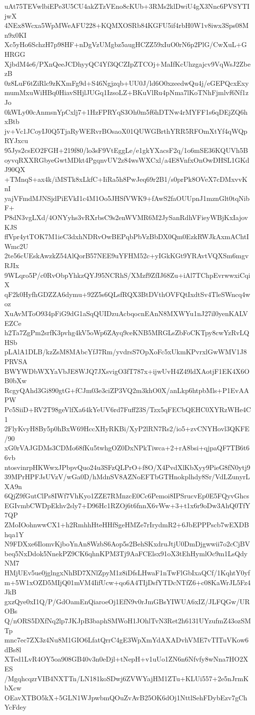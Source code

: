 uAt75TEVwlbiEPe3U5CU4akZTzVEno8cKUb+3RMs2klDwiU4gX3Nnc6PVSYTIjwX
4NEx8Wcxa5WpMWeAFU228+KQMXOSRb84KGFU5if4rbH0W1v8iwx3Sps08Mn9x0KI
Xc5yHo6SchzH7p98HF+nDgVzUMgbz5augHCZZ59xIuO0rN6p2PlG/CwXuL+GHRGG
XjbdM4e6/PXnQeeJCDhyyQC4Yf3QCZIpZTCOj+MaIfKcUhzgajcv9VqWsJ2ZbezB
0z8LuF6tZiRlc9zKXmFg9d+S46Ngjzqb+UU0J/ld6O0xzeedwQu4j/eGEPQcxExy
mumMxuWiHBq0HiavSHjlJUGq1IzsoLZ+BKuVlRu4pNma7lKoTNhFjmlvf6Nf1zJo
0kWLy00cAnmsnYpCxlj7+1HzFPRYqS3Oh0m5f6hDTNw4rMYFF1s6qDEjZQ6hxBtb
jv+Vc1JCoyIJ0Q5TjaRyWERvrBOsaoX01QUWGBrthYRR5RFOmXtYf4qWQpRYJxcu
95Jys2csEO2FGH+219f80/lo3sF9VtEggLe/e1gkYXacsF2q/1o6mSE36KQUVh5B
oyvqRXXRGbyeGwtMDkt4PgqnvUV2z84wsWXCxl/a4E8VnfxOnOwDHSL1GKdJ90QX
+TMnqS+ax4k/iMSTk8xLkfC+IiRa5h8PwJeq69r2B1/s0prPk8OVeX7cDMxvvKnI
yajVFmdMJNSjdPiEVkI1c4M1Oo5JHSfVWK9+fAwS2faOUUpnJ1mznGlt0tqNibF+
P8dN3vgLXd/4ONYyhs3vRXrbsC9s2enWVMR6M2JySanRdhVFieyWBjKxIajovKJS
ffVpr4ytTOK7M1ieC3dxhNDRvOwBEPqbPbVzBbDX0Qm0EzkRWJkAxmAChtIWmc2U
2te56cUEskAwzkZ54AlQorB57NEE9uYFHM52c+yIGkKGt9YRAvtVQXSm6mgvRJIx
9WLqro5P/c0RvObpYhkzQYJ95NCRhS/XMzf9ZfIJ68Zu+iAl7TChpEvrwwxiCqiX
qF2k0HyfhGDZZA6dymu+92Z5s6QLsfRQX3BtDVthOVFQtIxdtSv4TleSWncq4woz
XuAvMToO934pFiG9dG1aSqQUIDzuAcbqocnEAnN8MXWYu1nJ27il0yenKALVEZCe
h2Ta7ZgPm2srfK3pvhg4kV5oWp6ZAyq9ceKNB5MRGLsZbFoCKTpy8cwYzRvLQHSb
pLAlA1DLB/kzZsM8MAbcYfJ7Rm/yvdrsS7OpXoFc5xUkmKPvrxlGwWMV1J8PRVSA
BWYWDbWXYaVbJE8WJQ7JXsvigO3fT787x+ijwUvH4Z49ldXAotjF1EK4X6OB0bXw
RcgyQAhd3Gi890gtG+fCJm03e3ciZP3VQ2m3khO0X/anLkp6htpbMls+P1EvAAPW
Pc5SiiD+RV2T98geVlfXa64kYeUV6rd7Fuff23S/Tzx5qFECbQEHC0XYRzWHe4C1
2FlyKvyH8By5p0hBxW69HccXHyRKBi/XyP2lRN7Rs2/io5+zvCNYHovl3QKFE/90
xG0rVAJGDMs3CDMo68fKu5twhgOZ0DxNPkTiwca+2+rA8bsi+qjpaQF7TB6t66vb
ntosvinrpHKWwxJPbpvQuo24u3SFzQLPrO+f8O/X4PvdXlKbXyy9PieG8fN0ytj9
39MPrHPFJsUVzV/wGa0D/hMdnSV8AZNoEFTbGTHnokplhdy8Sr/VdLZunyrLXA9n
6QjZ9fGutClPs8IWf7VhKyo1ZZE7RMnzcE0Cc6Pemoi8IPSrucvEp0E5FQyvGhcs
EGIvmbCWDpEkhv2sly7+D96Hc1RZOj6t6fnnX6vWw+3+t1x6r9oDw3AhQ0TfY7QP
ZMoIOohnwwCX1+h2RmhhHteHHfSgeHMZe7rIrydmR2+6JbEPPPscb7wEXDBhqa1Y
N9FDXxe6IlomvKjboYnAn8WzbS6Aop5s2BehSKxdruJtjU0DmDjgwwii7o2cCjBV
beq5NxDdok5NnekPZ9CK6qhnKPM3Tj9AaFCElsx91oX3tEhHymlOc9m1LsQdyNM7
HMjUEv5ue0jglngxNhBD7XNlZpyM1z8iDfsLHwaF1nTwFlGbIxaQCf/1KqhtY0yf
m+5W1xOZD5MIjQ01mVM4IifUcw+qo6A4TIjDsfYTDcNTfZ6+c08KaWrJL5Fz4JkB
gxzQye0xI1Q/P/GdOamEnQiaroeOj1EfN9v0rJmGBsYIWUA6xIZ/JLFQGw/UROBs
Q/nORS5DXfNq2lp7JKJpB3baphSMWoH1JOhlTvN3Ret2h6131UYzufmZ43ozSMTp
mnc7ec7ZX3z4Nu8M1GIO6LfatQrrC4gE3WpXmYdAXADvhVME7vTITuVKow6dBs8l
XTed1LvR4OY5oa908GB40v3n0eDjl+tNepH+v1uUo1ZN6n6Nfvfy8wNna7HO2XES
/MgqhcqzrVIB4NXTTn/LN181koSDwj6ZVWYajHM1ZTu+KLUi557+2e5nJrmKbXcw
OEavXTBO5kX+5GLN1WJpwbmQOuZvAvB25OK6dOj1NttlSehFDybEzv7gChYcFdey
